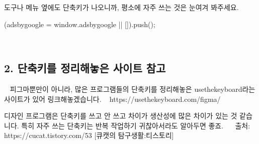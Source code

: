 \documentclass[12pt, a4paper, oneside]{book}
\begin{document}
도구나 메뉴 옆에도 단축키가 나오니까, 평소에 자주 쓰는 것은 눈여겨 봐주세요.
 


(adsbygoogle = window.adsbygoogle || []).push({});

 
	\subsection{2. 단축키를 정리해놓은 사이트 참고}
 
피그마뿐만이 아니라, 많은 프로그램들의 단축키를 정리해놓은 usethekeyboard라는 사이트가 있어 링크해놓겠습니다.
 
https://usethekeyboard.com/figma/

디자인 프로그램은 단축키를 쓰고 안 쓰고 차이가 생산성에 많은 차이가 있는 것 같습니다. 특히 자주 쓰는 단축키는 반복 작업하기 귀찮아서라도 알아두면 좋죠. 
 
출처: https://cucat.tistory.com/53 [큐캣의 탐구생활:티스토리]

\end{document}
